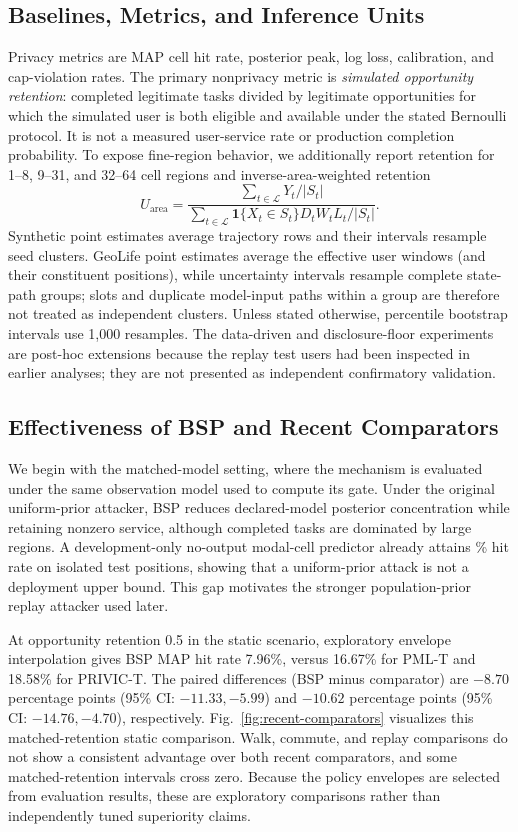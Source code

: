 \documentclass[10pt,journal,compsoc]{IEEEtran}
\newcommand{\ind}{\mathbf{1}}
\begin{document}
\subsection{Baselines, Metrics, and Inference Units}
Privacy metrics are MAP cell hit rate, posterior peak, log loss, calibration, and cap-violation rates. The primary nonprivacy metric is \emph{simulated opportunity retention}: completed legitimate tasks divided by legitimate opportunities for which the simulated user is both eligible and available under the stated Bernoulli protocol. It is not a measured user-service rate or production completion probability. To expose fine-region behavior, we additionally report retention for 1--8, 9--31, and 32--64 cell regions and inverse-area-weighted retention
\begin{equation}
 U_{\mathrm{area}}=
 \frac{\sum_{t\in\mathcal L}Y_t/|S_t|}
 {\sum_{t\in\mathcal L}\ind\{X_t\in S_t\}D_tW_tL_t/|S_t|}.
 \label{eq:weighted-utility}
\end{equation}
Synthetic point estimates average trajectory rows and their intervals resample seed clusters. GeoLife point estimates average the effective user windows (and their constituent positions), while uncertainty intervals resample complete state-path groups; slots and duplicate model-input paths within a group are therefore not treated as independent clusters. Unless stated otherwise, percentile bootstrap intervals use 1,000 resamples. The data-driven and disclosure-floor experiments are post-hoc extensions because the replay test users had been inspected in earlier analyses; they are not presented as independent confirmatory validation.

\subsection{Effectiveness of BSP and Recent Comparators}
We begin with the matched-model setting, where the mechanism is evaluated under the same observation model used to compute its gate. Under the original uniform-prior attacker, BSP reduces declared-model posterior concentration while retaining nonzero service, although completed tasks are dominated by large regions. A development-only no-output modal-cell predictor already attains \PopulationPriorHit\% hit rate on isolated test positions, showing that a uniform-prior attack is not a deployment upper bound. This gap motivates the stronger population-prior replay attacker used later.

At opportunity retention 0.5 in the static scenario, exploratory envelope interpolation gives BSP MAP hit rate 7.96\%, versus 16.67\% for PML-T and 18.58\% for PRIVIC-T. The paired differences (BSP minus comparator) are \(-8.70\) percentage points (95\% CI: \(-11.33,-5.99\)) and \(-10.62\) percentage points (95\% CI: \(-14.76,-4.70\)), respectively. Fig.~\ref{fig:recent-comparators} visualizes this matched-retention static comparison. Walk, commute, and replay comparisons do not show a consistent advantage over both recent comparators, and some matched-retention intervals cross zero. Because the policy envelopes are selected from evaluation results, these are exploratory comparisons rather than independently tuned superiority claims.
\end{document}

